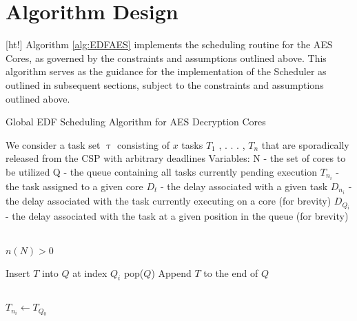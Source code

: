\section{Algorithm Design}\label{subsec:AlgoImpl}[ht!]
Algorithm \ref{alg:EDFAES} implements the scheduling routine for the AES Cores, as governed by the constraints and assumptions outlined above. This algorithm serves as the guidance for the implementation of the Scheduler as outlined in subsequent sections, subject to the constraints and assumptions outlined above.
\begin{algorithm}
    \caption{Global EDF Scheduling Algorithm for AES Decryption Cores}\label{alg:EDFAES}
    \begin{algorithmic}

        \State We consider a task set $\uptau$ consisting of $x$ tasks $T_1$ , . . . , $T_n$ that are sporadically released from the CSP with arbitrary deadlines
        \State Variables: 
        \State N - the set of cores to be utilized
        \State Q - the queue containing all tasks currently pending execution
        \State $T_{n_i}$ - the task assigned to a given core
        \State $D_t$ - the delay associated with a given task
        \State $D_{n_i}$ - the delay associated with the task currently executing on a core (for brevity)
        \State $D_{Q_i}$ - the delay associated with the task at a given position in the queue (for brevity)

        \\

        \Require $n(N) > 0$ 

                    \State Insert $T$ into $Q$ at index $Q_i$
                    \State \Return pop($Q$)
                \EndIf
            \EndFor
            \State Append $T$ to the end of $Q$ 
        \EndFunction

        \\

         
                        \State $T_{n_i} \gets T_{Q_0}$ 


\end{algorithmic}
\end{algorithm}
